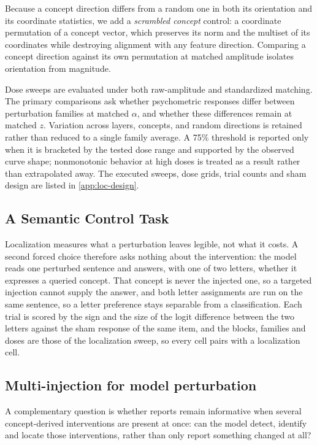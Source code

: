 Because a concept direction differs from a random one in both its orientation
and its coordinate statistics, we add a \emph{scrambled concept} control: a
coordinate permutation of a concept vector, which preserves its norm and the
multiset of its coordinates while destroying alignment with any feature
direction. Comparing a concept direction against its own permutation at
matched amplitude isolates orientation from magnitude.

Dose sweeps are evaluated under both raw-amplitude and standardized
matching. The primary comparisons ask whether psychometric responses differ
between perturbation families at matched $\alpha$, and whether these
differences remain at matched $z$. Variation across layers, concepts, and
random directions is retained rather than reduced to a single family
average. A 75\% threshold is reported only when it is bracketed by the tested
dose range and supported by the observed curve shape; nonmonotonic behavior
at high doses is treated as a result rather than extrapolated away. The
executed sweeps, dose grids, trial counts and sham design are listed in
\cref{app:loc-design}.

\subsection{A Semantic Control Task}
\label{sec:degradation-approach}

Localization measures what a perturbation leaves legible, not what it costs.
A second forced choice therefore asks nothing about the intervention: the
model reads one perturbed sentence and answers, with one of two letters,
whether it expresses a queried concept. That concept is never the injected
one, so a targeted injection cannot supply the answer, and both letter
assignments are run on the same sentence, so a letter preference stays
separable from a classification. Each trial is scored by the sign and the size
of the logit difference between the two letters against the sham response of
the same item, and the blocks, families and doses are those of the
localization sweep, so every cell pairs with a localization cell.

\subsection{Multi-injection for model perturbation}
\label{sec:multi-injection-approach}

A complementary question is whether reports remain informative when several concept-derived interventions are present at once: can the model detect, identify and locate those interventions, rather than only report something changed at all?


